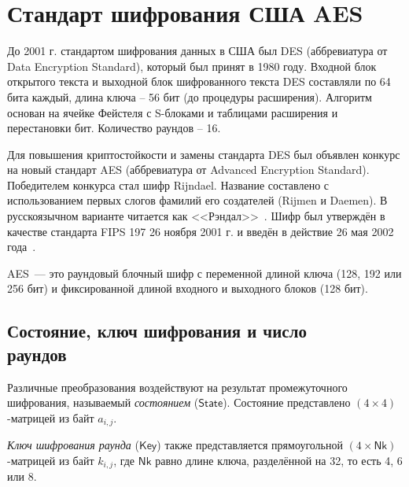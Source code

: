 \section{Стандарт шифрования США AES}

До 2001 г. стандартом шифрования данных в США был DES (аббревиатура от Data Encryption Standard), который был принят в 1980 году. Входной блок открытого текста и выходной блок шифрованного текста DES составляли по 64 бита каждый, длина ключа -- 56 бит (до процедуры расширения). Алгоритм основан на ячейке Фейстеля с S-блоками и таблицами расширения и перестановки бит. Количество раундов -- 16.

Для повышения криптостойкости и замены стандарта DES был объявлен конкурс на новый стандарт AES (аббревиатура от Advanced Encryption Standard). Победителем конкурса стал шифр Rijndael. Название составлено с использованием первых слогов фамилий его создателей (Rijmen и Daemen). В русскоязычном варианте читается как <<Рэндал>>~\cite{Kiwi:1999}. Шифр был утверждён в качестве стандарта FIPS 197 26 ноября 2001 г. и введён в действие 26 мая 2002 года~\cite{FIPS-PUB-197}.

AES~--- это раундовый блочный шифр с переменной длиной ключа (128, 192 или 256 бит) и фиксированной длиной входного и выходного блоков (128 бит).

\subsection[Состояние, ключ шифрования и число раундов]{Состояние, ключ шифрования и число \protect\\ раундов}

Различные преобразования воздействуют на результат промежуточного шифрования, называемый \emph{состоянием} ($\mathsf{State}$). Состояние представлено $(4 \times 4)$-матрицей из байт $a_{i,j}$.

\emph{Ключ шифрования раунда} ($\mathsf{Key}$) также представляется прямоугольной $(4 \times \mathsf{Nk})$-матрицей из байт $k_{i,j}$, где $\mathsf{Nk}$ равно длине ключа, разделённой на 32, то есть 4, 6 или 8.

